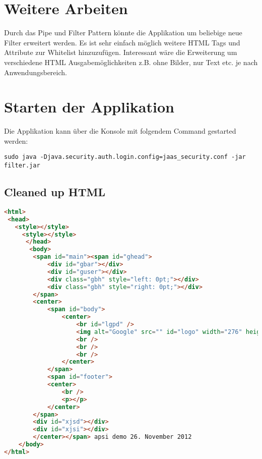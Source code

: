 \section{Weitere Arbeiten}

Durch das Pipe und Filter Pattern könnte die Applikation um beliebige neue Filter erweitert werden. Es ist sehr einfach möglich weitere HTML Tags und Attribute zur Whitelist hinzuzufügen. Interessant wäre die Erweiterung um verschiedene HTML Ausgabemöglichkeiten z.B. ohne Bilder, nur Text etc. je nach Anwendungsbereich.

\section{Starten der Applikation}

Die Applikation kann über die Konsole mit folgendem Command gestarted werden:
\newline
\begin{lstlisting}[caption=Start der Applikation]
sudo java -Djava.security.auth.login.config=jaas_security.conf -jar filter.jar 
\end{lstlisting}
\newpage
\begin{appendix}
\section{Cleaned up HTML}
\begin{lstlisting}[caption=Resultat des Filters auf dem Test-File,language=HTML]
<html>
 <head>
   <style></style>
     <style></style>
      </head>
       <body>
        <span id="main"><span id="ghead">
            <div id="gbar"></div>
            <div id="guser"></div>
            <div class="gbh" style="left: 0pt;"></div>
            <div class="gbh" style="right: 0pt;"></div>
        </span> 
        <center>
            <span id="body">
                <center>
                    <br id="lgpd" />
                    <img alt="Google" src="" id="logo" width="276" height="110" />
                    <br />
                    <br />
                    <br />
                </center>
            </span> 
            <span id="footer">
            <center>
                <br />
                <p></p>
            </center>
        </span> 
        <div id="xjsd"></div>
        <div id="xjsi"></div>
        </center></span> apsi demo 26. November 2012 
    </body>
</html>

\end{lstlisting}
\end{appendix}
